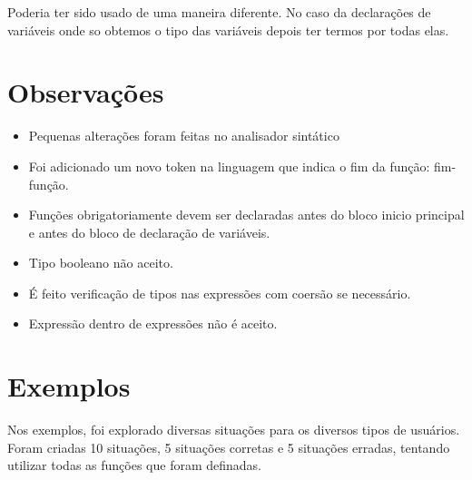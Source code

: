 \documentclass[a4paper,10pt]{article}
\begin{document}
Poderia ter sido usado de uma maneira diferente. No caso da declarações de variáveis onde so obtemos o tipo das variáveis depois ter termos por todas elas.

\section{Observações}
  \begin{itemize}
    \item Pequenas alterações foram feitas no analisador sintático
    \item Foi adicionado um novo token na linguagem que indica o fim da função: fim-função.
    \item Funções obrigatoriamente devem ser declaradas antes do bloco inicio principal e antes do bloco de declaração de variáveis.
    \item Tipo booleano não aceito.
    \item É feito verificação de tipos nas expressões com coersão se necessário.
    \item Expressão dentro de expressões não é aceito.
  \end{itemize}

\section{Exemplos}
Nos exemplos, foi explorado diversas situações para os diversos tipos de usuários. Foram criadas 10 situações, 5 situações corretas e 5
situações erradas, tentando utilizar todas as funções que foram definadas.
\end{document}
